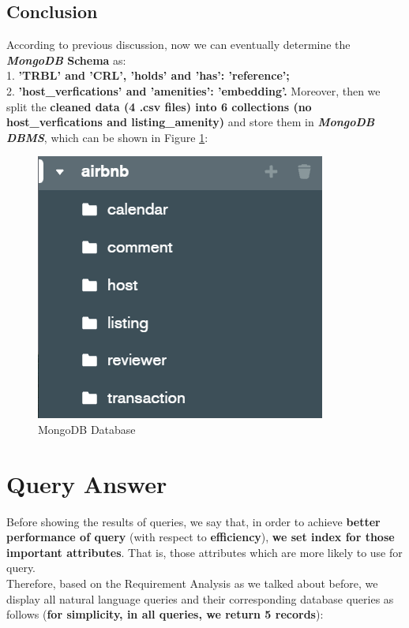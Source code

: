 \documentclass{article}
\begin{document}
	\subsection{Conclusion}
	According to previous discussion, now we can eventually determine the \textbf{\textit{MongoDB} Schema} as:
	\vspace{3pt}
	\\
	1. \textbf{'TRBL' and 'CRL', 'holds' and 'has': 'reference';}
	\\
	2. \textbf{'host\_verfications' and 'amenities': 'embedding'.}
	\newpage
	\noindent
	Moreover, then we split the \textbf{cleaned data (4 .csv files) into 6 collections (no host\_verfications and listing\_amenity)} and store them in \textbf{\textit{MongoDB DBMS}}, which can be shown in Figure \ref{fig:019}:
	\begin{figure}[h]
		\centering
		\includegraphics[width=.2\textheight]{mangodb_demo.png}
		\caption{MongoDB Database}
		\label{fig:019}
	\end{figure}
	\section{Query Answer}
	Before showing the results of queries, we say that, in order to achieve \textbf{better performance of query} (with respect to \textbf{efficiency}), \textbf{we set index for those important attributes}. That is, those attributes which are more likely to use for query.
	\vspace{3pt}
	\\
	Therefore, based on the Requirement Analysis as we talked about before, we display all natural language queries and their corresponding database queries as follows (\textbf{for simplicity, in all queries, we return 5 records}):
\end{document}
